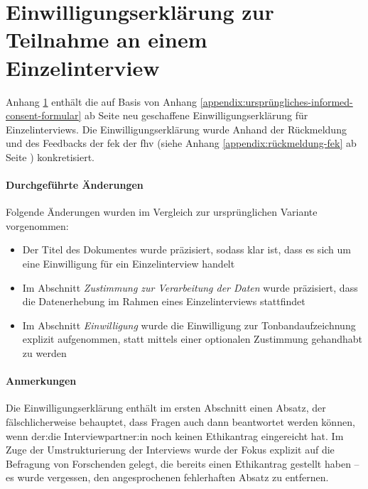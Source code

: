 \documentclass[a4paper,12pt,twoside]{scrreprt}
\begin{document}


\chapter{Einwilligungserklärung zur Teilnahme an einem Einzelinterview}
\label{appendix:informed-consent-einzelinterview}

Anhang \ref{appendix:informed-consent-einzelinterview} enthält die auf Basis von Anhang \ref{appendix:ursprüngliches-informed-consent-formular} ab Seite \pageref{appendix:ursprüngliches-informed-consent-formular} neu geschaffene Einwilligungserklärung für Einzelinterviews. Die Einwilligungserklärung wurde Anhand der Rückmeldung und des Feedbacks der \acl{fek} der \acl{fhv} (siehe Anhang \ref{appendix:rückmeldung-fek} ab Seite \pageref{appendix:rückmeldung-fek}) konkretisiert.

\subsubsection*{Durchgeführte Änderungen}
\label{appendix:änderungen-informed-consent-einzelinterview}

Folgende Änderungen wurden im Vergleich zur ursprünglichen Variante vorgenommen:
\begin{itemize}
    \item Der Titel des Dokumentes wurde präzisiert, sodass klar ist, dass es sich um eine Einwilligung für ein Einzelinterview handelt
    \item Im Abschnitt \textit{Zustimmung zur Verarbeitung der Daten} wurde präzisiert, dass die Datenerhebung im Rahmen eines Einzelinterviews stattfindet
    \item Im Abschnitt \textit{Einwilligung} wurde die Einwilligung zur Tonbandaufzeichnung explizit aufgenommen, statt mittels einer optionalen Zustimmung gehandhabt zu werden
\end{itemize}

\subsubsection*{Anmerkungen}
\label{appendix:anmerkungen-informed-consent-einzelinterview}

Die Einwilligungserklärung enthält im ersten Abschnitt einen Absatz, der fälschlicherweise behauptet, dass Fragen auch dann beantwortet werden können, wenn der:die Interviewpartner:in noch keinen Ethikantrag eingereicht hat. Im Zuge der Umstrukturierung der Interviews wurde der Fokus explizit auf die Befragung von Forschenden gelegt, die bereits einen Ethikantrag gestellt haben -- es wurde vergessen, den angesprochenen fehlerhaften Absatz zu entfernen.
\end{document}
